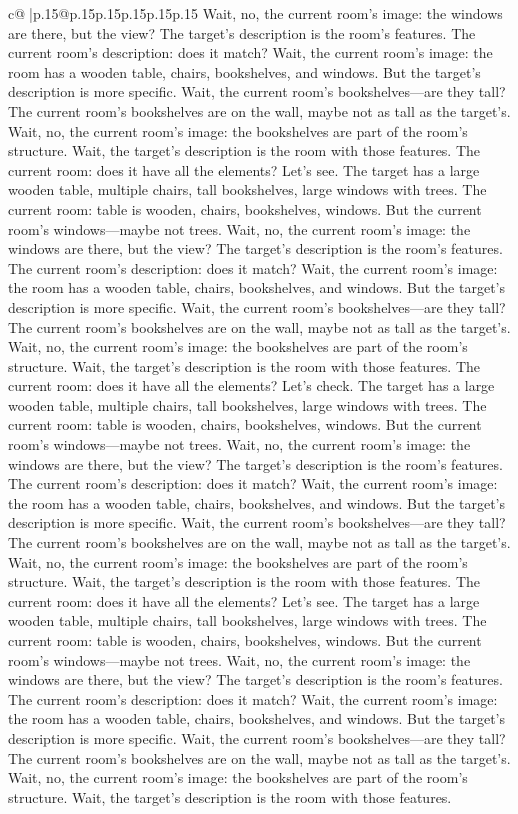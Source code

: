 \documentclass{article}
\begin{document}
{\begin{supertabular}{c@{$\;$}|p{.15\linewidth}@{}p{.15\linewidth}p{.15\linewidth}p{.15\linewidth}p{.15\linewidth}p{.15\linewidth}}
{{{Wait, no, the current room's image: the windows are there, but the view? The target's description is the room's features. The current room's description: does it match? Wait, the current room's image: the room has a wooden table, chairs, bookshelves, and windows. But the target's description is more specific. Wait, the current room's bookshelves—are they tall? The current room's bookshelves are on the wall, maybe not as tall as the target's. Wait, no, the current room's image: the bookshelves are part of the room's structure. Wait, the target's description is the room with those features. The current room: does it have all the elements? Let's see. The target has a large wooden table, multiple chairs, tall bookshelves, large windows with trees. The current room: table is wooden, chairs, bookshelves, windows. But the current room's windows—maybe not trees. Wait, no, the current room's image: the windows are there, but the view? The target's description is the room's features. The current room's description: does it match? Wait, the current room's image: the room has a wooden table, chairs, bookshelves, and windows. But the target's description is more specific. Wait, the current room's bookshelves—are they tall? The current room's bookshelves are on the wall, maybe not as tall as the target's. Wait, no, the current room's image: the bookshelves are part of the room's structure. Wait, the target's description is the room with those features. The current room: does it have all the elements? Let's check. The target has a large wooden table, multiple chairs, tall bookshelves, large windows with trees. The current room: table is wooden, chairs, bookshelves, windows. But the current room's windows—maybe not trees. Wait, no, the current room's image: the windows are there, but the view? The target's description is the room's features. The current room's description: does it match? Wait, the current room's image: the room has a wooden table, chairs, bookshelves, and windows. But the target's description is more specific. Wait, the current room's bookshelves—are they tall? The current room's bookshelves are on the wall, maybe not as tall as the target's. Wait, no, the current room's image: the bookshelves are part of the room's structure. Wait, the target's description is the room with those features. The current room: does it have all the elements? Let's see. The target has a large wooden table, multiple chairs, tall bookshelves, large windows with trees. The current room: table is wooden, chairs, bookshelves, windows. But the current room's windows—maybe not trees. Wait, no, the current room's image: the windows are there, but the view? The target's description is the room's features. The current room's description: does it match? Wait, the current room's image: the room has a wooden table, chairs, bookshelves, and windows. But the target's description is more specific. Wait, the current room's bookshelves—are they tall? The current room's bookshelves are on the wall, maybe not as tall as the target's. Wait, no, the current room's image: the bookshelves are part of the room's structure. Wait, the target's description is the room with those features. }}}
\end{supertabular}}
\end{document}
